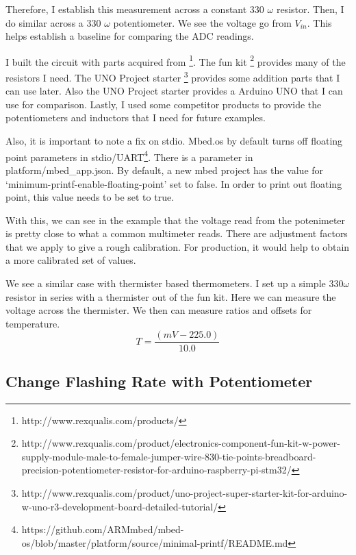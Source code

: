\documentclass{article}
\begin{document}
Therefore, I establish this measurement across a constant 330 $\omega$ resistor.  Then, I do similar across a 330 $\omega$ potentiometer.  We see the voltage go from $V_{in}$.  This helps establish a baseline for comparing the ADC readings.   

I built the circuit with parts acquired from \footnote{http://www.rexqualis.com/products/}.  The fun kit \footnote{http://www.rexqualis.com/product/electronics-component-fun-kit-w-power-supply-module-male-to-female-jumper-wire-830-tie-points-breadboard-precision-potentiometer-resistor-for-arduino-raspberry-pi-stm32/} 
provides many of the resistors I need.   The UNO Project starter \footnote{http://www.rexqualis.com/product/uno-project-super-starter-kit-for-arduino-w-uno-r3-development-board-detailed-tutorial/} provides some addition parts that I can use later.  Also the UNO Project starter provides a Arduino UNO that I can use for comparison.  Lastly, I used some competitor products to provide the potentiometers and inductors that I need for future examples.  


Also, it is important to note a fix on stdio.  Mbed.os by default turns off floating point parameters in stdio/UART\footnote{https://github.com/ARMmbed/mbed-os/blob/master/platform/source/minimal-printf/README.md}.  
There is a parameter in platform/mbed\_app.json.  By default, a new mbed project has the value for `minimum-printf-enable-floating-point' set to false.  In order to print out floating point, this value needs to be set to true.  

With this, we can see in the example that the voltage read from the potenimeter is pretty close to what a common multimeter reads.  There are adjustment factors that we apply to give a rough calibration.  For production, it would help to obtain a more calibrated set of values.  

We see a similar case with thermister based thermometers.  I set up a simple $330\omega$ resistor in series with a thermister out of the fun kit.  Here we can measure the voltage across the thermister.  We then can measure ratios and offsets for temperature.  
\begin{equation}
	T = \frac{(mV - 225.0)}{10.0}
\end{equation}



\subsection{Change Flashing Rate with Potentiometer} %
\label{sub:change_flashing_rate_with_potentiometer}
\end{document}
